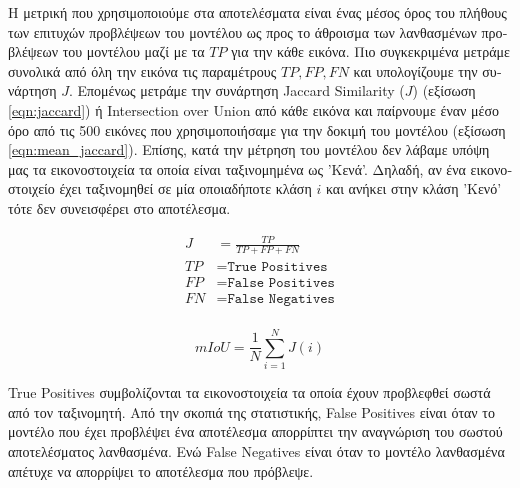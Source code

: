 \textgreek{Η μετρική που χρησιμοποιούμε στα αποτελέσματα είναι ένας μέσος όρος του πλήθους των επιτυχών προβλέψεων του μοντέλου ως προς το άθροισμα των λανθασμένων προβλέψεων του μοντέλου μαζί με τα $TP$ για την κάθε εικόνα. Πιο συγκεκριμένα μετράμε συνολικά από όλη την εικόνα τις παραμέτρους }$TP, FP, FN$ \textgreek{και υπολογίζουμε την συνάρτηση $J$. Επομένως μετράμε την συνάρτηση }Jaccard Similarity ($J$) \textgreek{(εξίσωση }\ref{eqn:jaccard}) \textgreek{ή} Intersection over Union \textgreek{από κάθε εικόνα και παίρνουμε έναν μέσο όρο από τις 500 εικόνες που χρησιμοποιήσαμε για την δοκιμή του μοντέλου (εξίσωση} \ref{eqn:mean_jaccard}). \textgreek{Επίσης, κατά την μέτρηση του μοντέλου δεν λάβαμε υπόψη μας τα εικονοστοιχεία τα οποία είναι ταξινομημένα ως 'Κενά'. Δηλαδή, αν ένα εικονοστοιχείο έχει ταξινομηθεί σε μία οποιαδήποτε κλάση $i$ και ανήκει στην κλάση 'Κενό' τότε δεν συνεισφέρει στο αποτέλεσμα.}

\noindent\begin{minipage}{.5\linewidth}
  \begin{equation}
  \label{eqn:jaccard}
    \begin{split}
  J &= \frac{TP}{TP+FP+FN}\\[1cm]
  TP &= \texttt{True Positives}\\ 
  FP &= \texttt{False Positives}\\
  FN &= \texttt{False Negatives}\\
  \end{split}
  \end{equation}
\end{minipage}%
\begin{minipage}{.5\linewidth}
  \begin{equation}
  \label{eqn:mean_jaccard}
  mIoU = \frac{1}{N}\sum_{i=1}^{N} J(i)
  \end{equation}
\end{minipage}
  
True Positives \textgreek{συμβολίζονται τα εικονοστοιχεία τα οποία έχουν προβλεφθεί σωστά από τον ταξινομητή. Από την σκοπιά της στατιστικής, } False Positives \textgreek{είναι όταν το μοντέλο που έχει προβλέψει ένα αποτέλεσμα απορρίπτει την αναγνώριση του σωστού αποτελέσματος λανθασμένα. Ενώ }False Negatives \textgreek{είναι όταν το μοντέλο λανθασμένα απέτυχε να απορρίψει το αποτέλεσμα που πρόβλεψε.} 
\par 


